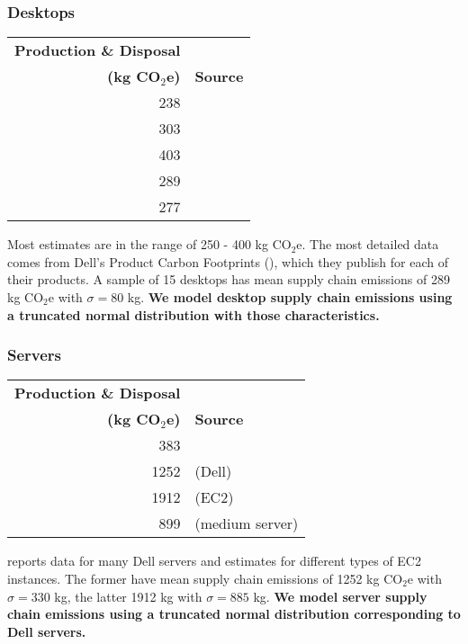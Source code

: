\documentclass[11pt]{article}
\newcommand{\assumption}[1]{{\bf #1}}
\begin{document}
\subsubsection{Desktops}

\begin{center}
\begin{tabular}{|r|l|}
\hline
\textbf{Production \& Disposal} & \\
\textbf{(kg CO$_2$e)} & \textbf{Source} \\ \hline
238 & \textcite{ecoinvent} \\ \hline
303 & \textcite{teehan2013} \\ \hline
403 & \textcite{unctadder2024} \\ \hline
289 & \textcite{dellpcf} \\ \hline
277 & \textcite{boavizta} \\ \hline
\end{tabular}
\label{tab:embodied_emissions:desktops}
\end{center}

Most estimates are in the range of 250 - 400 kg CO$_2$e. The most detailed data comes from
Dell's Product Carbon Footprints (\textcite{dellpcf}), which they publish for each of their products.
A sample of 15 desktops has mean supply chain emissions of 289 kg CO$_2$e with $\sigma = 80$ kg.
\assumption{We model desktop supply chain emissions using a truncated normal distribution with those characteristics.}

\subsubsection{Servers}

\begin{center}
\begin{tabular}{|r|l|}
\hline
\textbf{Production \& Disposal} & \\
\textbf{(kg CO$_2$e)} & \textbf{Source} \\ \hline
383 & \textcite{teehan2013} \\ \hline
1252 & \textcite{davy2021} (Dell) \\ \hline
1912 & \textcite{davy2021} (EC2) \\ \hline
899 & \textcite{boavizta} (medium server)\\ \hline
\end{tabular}
\label{tab:embodied_emissions:servers}
\end{center}

\textcite{davy2021} reports data for many Dell servers and estimates for different types of EC2 instances.
The former have mean supply chain emissions of 1252 kg CO$_2$e with $\sigma = 330$ kg, the latter
1912 kg with $\sigma = 885$ kg.
\assumption{We model server supply chain emissions using a truncated normal distribution corresponding
to Dell servers.}
\end{document}
